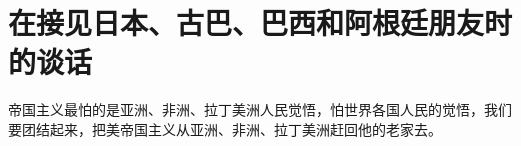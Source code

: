 \section[在接见日本、古巴、巴西和阿根廷朋友时的谈话（一九六六年七月十日武汉）]{在接见日本、古巴、巴西和阿根廷朋友时的谈话}


帝国主义最怕的是亚洲、非洲、拉丁美洲人民觉悟，怕世界各国人民的觉悟，我们要团结起来，把美帝国主义从亚洲、非洲、拉丁美洲赶回他的老家去。

